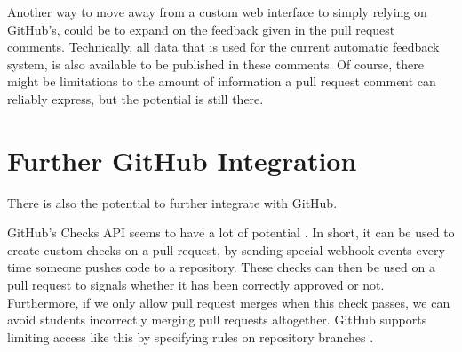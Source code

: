 Another way to move away from a custom web interface to simply relying on GitHub's, could be to expand on the feedback given in the pull request comments.
Technically, all data that is used for the current automatic feedback system, is also available to be published in these comments.
Of course, there might be limitations to the amount of information a pull request comment can reliably express, but the potential is still there.

\section{Further GitHub Integration}

There is also the potential to further integrate with GitHub.

GitHub's Checks API seems to have a lot of potential \cite{checks}.
In short, it can be used to create custom checks on a pull request, by sending special webhook events every time someone pushes code to a repository.
These checks can then be used on a pull request to signals whether it has been correctly approved or not.
Furthermore, if we only allow pull request merges when this check passes, we can avoid students incorrectly merging pull requests altogether.
GitHub supports limiting access like this by specifying rules on repository branches \cite{branches}.
